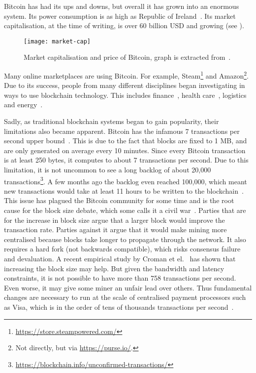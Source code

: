 Bitcoin has had its ups and downs, but overall it has grown into an enormous system.
Its power consumption is as high as Republic of Ireland~\cite{o2014bitcoin}.
Its market capitalisation, at the time of writing, is over 60 billion USD and growing (see ).
\begin{figure}[h]
\centering
\texttt{[image: market-cap]}
\caption{Market capitalisation and price of Bitcoin, graph is extracted from~\cite{bitcoinmarketcap}.}
\label{fig:market-cap}
\end{figure}
Many online marketplaces are using Bitcoin.
For example, Steam\footnote{\url{https://store.steampowered.com/}} and Amazon\footnote{Not directly, but via \url{https://purse.io/}.}.
Due to its success, people from many different disciplines began investigating in ways to use blockchain technology.
This includes finance~\cite{finance}, health care~\cite{healthcare}, logistics~\cite{supplychain} and energy~\cite{energy}.

Sadly, as traditional blockchain systems began to gain popularity,
their limitations also became apparent.
Bitcoin has the infamous 7 transactions per second upper bound~\cite{vukolic2015quest}.
This is due to the fact that blocks are fixed to 1 MB,
and are only generated on average every 10 minutes.
Since every Bitcoin transaction is at least 250 bytes, it computes to about 7 transactions per second.
Due to this limitation, it is not uncommon to see a long backlog of about 20,000 transactions\footnote{\url{https://blockchain.info/unconfirmed-transactions/}}.
A few months ago the backlog even reached 100,000, which meant new transactions would take at least 11 hours to be written to the blockchain~\cite{bitcoinbacklog}.
This issue has plagued the Bitcoin community for some time and is the root cause for the block size debate, which some calls it a civil war~\cite{bitcoincivilwar}.
Parties that are for the increase in block size argue that a larger block would improve the transaction rate.
Parties against it argue that it would make mining more centralised because blocks take longer to propagate through the network.
It also requires a hard fork (not backwards compatible), which risks consensus failure and devaluation.
A recent empirical study by Croman et el.~\cite{croman2016scaling} has shown that increasing the block size may help.
But given the bandwidth and latency constraints,
it is not possible to have more than 758 transactions per second.
Even worse, it may give some miner an unfair lead over others.
Thus fundamental changes are necessary to run at the scale of centralised payment processors such as Visa,
which is in the order of tens of thousands transactions per second~\cite{visa}.

